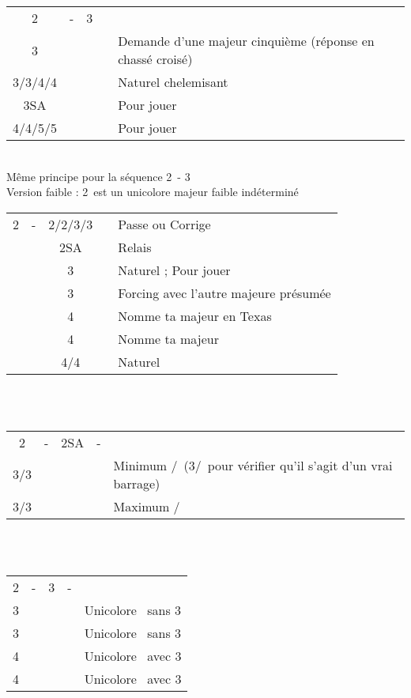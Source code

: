 \documentclass[a4paper, oneside, 11pt]{report}
\begin{document}
	\begin{tabular}{cccc|l}
	2\trefle & - & 3\trefle &&\\
	3\carreau &&&& Demande d'une majeur cinquième (réponse en chassé croisé)\\
	3\coeur/3\pique/4\trefle/4\carreau &&&& Naturel chelemisant\\
	3SA &&&& Pour jouer\\
	4\coeur/4\pique/5\trefle/5\carreau &&&& Pour jouer\\	
	\end{tabular}\\
	Même principe pour la séquence 2\trefle\ - 3\carreau\\

	Version faible : 2\carreau\ est un unicolore majeur faible indéterminé\\

	\begin{tabular}{cccc|l}
	2\carreau & - & 2\coeur/2\pique/3\coeur/3\pique && Passe ou Corrige\\
	&& 2SA && Relais\\
	&& 3\trefle && Naturel ; Pour jouer\\
	&& 3\carreau && Forcing avec l'autre majeure présumée\\
	&& 4\trefle && Nomme ta majeur en Texas\\
	&& 4\carreau && Nomme ta majeur\\
	&& 4\coeur/4\pique && Naturel\\
	\end{tabular}\\\\

	\begin{tabular}{cccc|l}
	2\carreau & - & 2SA & - &\\
	3\trefle/3\carreau &&&& Minimum \coeur/\pique\ (3\carreau/\coeur\ pour vérifier qu'il s'agit d'un vrai barrage)\\
	3\coeur/3\pique &&&& Maximum \pique/\coeur\\
	\end{tabular}\\\\
	
	\begin{tabular}{cccc|l}
	2\carreau & - & 3\carreau & - &\\
	3\coeur &&&& Unicolore \coeur\ sans 3\pique\\
	3\pique &&&& Unicolore \pique\ sans 3\coeur\\
	4\trefle &&&& Unicolore \coeur\ avec 3\pique\\
	4\carreau &&&& Unicolore \pique\ avec 3\coeur\\
	\end{tabular}\\\\
\end{document}
